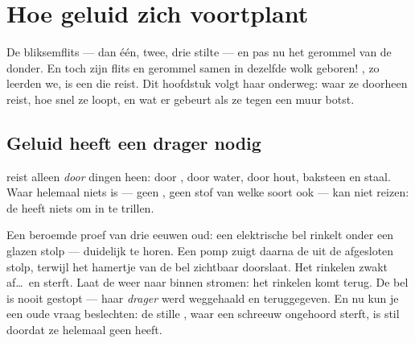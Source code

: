 \chapter{Hoe geluid zich voortplant}\label{ch:g4:how-sound-travels}

De bliksemflits --- dan één, twee, drie  stilte --- en pas nu
het gerommel van de donder. En toch zijn flits en gerommel samen in
dezelfde wolk geboren! , zo leerden we, is een  die
reist. Dit hoofdstuk volgt haar onderweg: waar ze doorheen reist, hoe
snel ze loopt, en wat er gebeurt als ze tegen een muur botst.

\section{Geluid heeft een drager nodig}

\begin{proposition}\label{prop:g4:how-sound-travels:carrier}
 reist alleen \emph{door} dingen heen: door , door
water, door hout, baksteen en staal. Waar helemaal niets is --- geen
, geen stof van welke soort ook --- kan  niet reizen: de
 heeft niets om in te trillen.
\end{proposition}

\begin{example}\label{ex:g4:how-sound-travels:jar}
Een beroemde proef van drie eeuwen oud: een elektrische bel rinkelt
onder een glazen stolp --- duidelijk te horen. Een pomp zuigt daarna
de  uit de afgesloten stolp, terwijl het hamertje van de bel
zichtbaar doorslaat. Het rinkelen zwakt af\dots\ en sterft. Laat de
 weer naar binnen stromen: het rinkelen komt terug. De bel is
nooit gestopt --- haar \emph{drager} werd weggehaald en teruggegeven.
En nu kun je een oude vraag beslechten: de stille , waar een
schreeuw ongehoord sterft, is stil doordat ze helemaal geen
 heeft.
\end{example}

